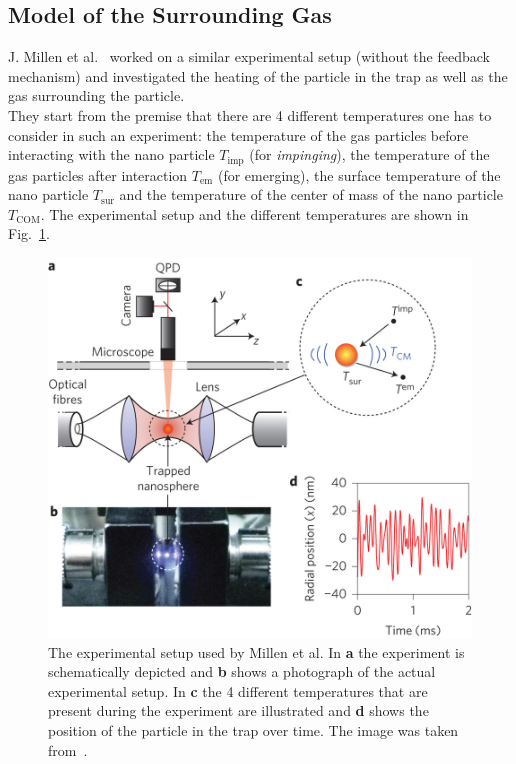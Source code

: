 \documentclass[12pt]{article}
\begin{document}
\subsection{Model of the Surrounding Gas}
J. Millen et al.~\cite{MillenJ.2014} worked on a similar experimental setup (without the feedback mechanism) and investigated the heating of the
particle in the trap as well as the gas surrounding the particle.\\
They start from the premise that there are 4 different temperatures one has to consider in such an experiment: the temperature of the gas particles
before interacting with the nano particle $T_\text{imp}$ (for \textit{impinging}), the temperature of the gas particles after 
interaction $T_\text{em}$ (for emerging), the surface temperature of the nano particle $T_\text{sur}$ and the temperature of the 
center of mass of the nano particle $T_\text{COM}$. The experimental setup
and the different temperatures are shown in Fig.~\ref{fig:levitation}.\\
\begin{figure}[H]
    \begin{center}
        \includegraphics[scale=0.2]{images/nnano_millen.jpg}
        \caption{The experimental setup used by Millen et al. In \textbf{a} the experiment is schematically depicted and \textbf{b} shows a photograph
            of the actual experimental setup. In \textbf{c} the 4 different temperatures that are present during the experiment are illustrated and
        \textbf{d} shows the position of the particle in the trap over time. The image was taken from~\cite{MillenJ.2014}.}
        \label{fig:levitation}
    \end{center}
\end{figure}
\end{document}
